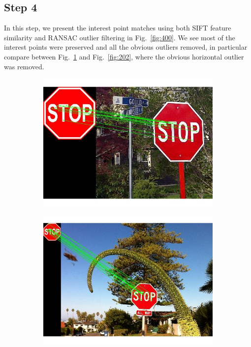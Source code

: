 \documentclass[a4paper]{iacas}
\begin{document}
\subsection{Step 4}

In this step, we present the interest point matches using both SIFT feature similarity and RANSAC outlier filtering in Fig.~\ref{fig:400}. We see most of the interest points were preserved and all the obvious outliers removed, in particular compare between Fig.~\ref{fig:402} and Fig.~\ref{fig:202}, where the obvious horizontal outlier was removed.

\begin{figure}[!htbp]
	
	\begin{subfigure}[b]{0.32\textwidth}
		\includegraphics[width=\textwidth]{402.jpg}
		\caption{}
		\label{fig:402}
	\end{subfigure}
	\begin{subfigure}[b]{0.32\textwidth}
		\includegraphics[width=\textwidth]{403.jpg}

\end{subfigure}
\end{figure}
\end{document}
